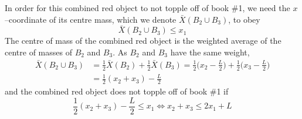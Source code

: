 \begin{itemize}
\begin{itemize}
\begin{efig}
\begin{center}
\end{center}
\end{efig}
In order for this combined red object to not topple off of book \#1,
we need the $x$--coordinate of its centre mass, which we denote
$\bar X(B_2\cup B_3)$, to obey
\begin{equation*}
\bar X(B_2\cup B_3) \le x_1
\end{equation*}
The centre of mass of the combined red object is the weighted
average  of the centre of masses of $B_2$ and $B_3$.
As $B_2$ and $B_3$ have the same weight,
\begin{align*}
\bar X(B_2\cup B_3) &= \frac{1}{2}\bar X(B_2) +\frac{1}{2}\bar X(B_3)
    = \frac{1}{2}\Big(x_2-\frac{L}{2}\Big)
      +\frac{1}{2}\Big(x_3-\frac{L}{2}\Big)
\\
&= \frac{1}{2}(x_2+x_3) -\frac{L}{2}
\end{align*}
and the combined red object does not topple off of book \#1 if
\begin{equation*}
\frac{1}{2}(x_2+x_3) -\frac{L}{2} \le x_1
\iff
x_2+x_3\le 2x_1+L
\end{equation*}


\end{itemize}
\end{itemize}
